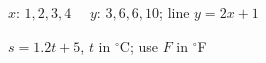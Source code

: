 \noindent\begin{minipage}[t]{0.48\textwidth}
\exlab $x$: $1,2,3,4$ \ \ $y$: $3,6,6,10$; line $y=2x+1$
\end{minipage}\hfill
\begin{minipage}[t]{0.48\textwidth}
\exlab $s=1.2t+5$, $t$ in $^{\circ}$C; use $F$ in $^{\circ}$F
\end{minipage}
